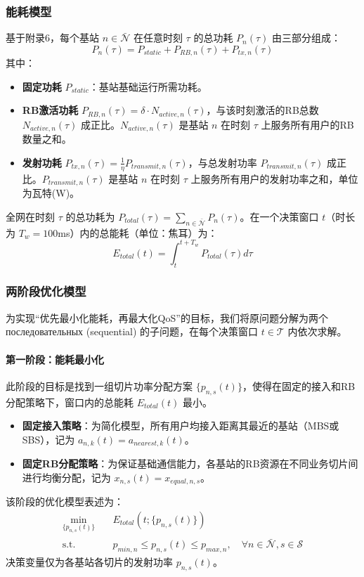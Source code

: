 \subsubsection{能耗模型}

基于附录6，每个基站 $n \in \bar{\mathcal{N}}$ 在任意时刻 $\tau$ 的总功耗 $P_n(\tau)$ 由三部分组成：
\begin{equation}
P_n(\tau) = P_{static} + P_{RB,n}(\tau) + P_{tx,n}(\tau)
\end{equation}
其中：
\begin{itemize}
  \item \textbf{固定功耗} $P_{static}$：基站基础运行所需功耗。
  \item \textbf{RB激活功耗} $P_{RB,n}(\tau) = \delta \cdot N_{active,n}(\tau)$，与该时刻激活的RB总数 $N_{active,n}(\tau)$ 成正比。$N_{active,n}(\tau)$ 是基站 $n$ 在时刻 $\tau$ 上服务所有用户的RB数量之和。
  \item \textbf{发射功耗} $P_{tx,n}(\tau) = \frac{1}{\eta} P_{transmit,n}(\tau)$，与总发射功率 $P_{transmit,n}(\tau)$ 成正比。$P_{transmit,n}(\tau)$ 是基站 $n$ 在时刻 $\tau$ 上服务所有用户的发射功率之和，单位为瓦特(W)。
\end{itemize}
全网在时刻 $\tau$ 的总功耗为 $P_{total}(\tau) = \sum_{n\in\bar{\mathcal{N}}} P_n(\tau)$。在一个决策窗口 $t$（时长为 $T_w=100$ms）内的总能耗（单位：焦耳）为：
\begin{equation}
E_{total}(t) = \int_{t}^{t+T_w} P_{total}(\tau) d\tau
\end{equation}

\subsubsection{两阶段优化模型}

为实现“优先最小化能耗，再最大化QoS”的目标，我们将原问题分解为两个 последовательных (sequential) 的子问题，在每个决策窗口 $t \in \mathcal{T}$ 内依次求解。

\paragraph{第一阶段：能耗最小化}
此阶段的目标是找到一组切片功率分配方案 $\{p_{n,s}(t)\}$，使得在固定的接入和RB分配策略下，窗口内的总能耗 $E_{total}(t)$ 最小。
\begin{itemize}
    \item \textbf{固定接入策略}：为简化模型，所有用户均接入距离其最近的基站（MBS或SBS），记为 $a_{n,k}(t) = a_{nearest, k}(t)$。
    \item \textbf{固定RB分配策略}：为保证基础通信能力，各基站的RB资源在不同业务切片间进行均衡分配，记为 $x_{n,s}(t) = x_{equal, n,s}$。
\end{itemize}
该阶段的优化模型表述为：
\begin{equation}
\begin{aligned}
\min_{\{p_{n,s}(t)\}} \quad & E_{total}(t; \{p_{n,s}(t)\}) \\
\text{s.t.} \quad & p_{min, n} \le p_{n,s}(t) \le p_{max, n}, \quad \forall n \in \bar{\mathcal{N}}, s \in \mathcal{S}
\end{aligned}
\end{equation}
决策变量仅为各基站各切片的发射功率 $p_{n,s}(t)$。

